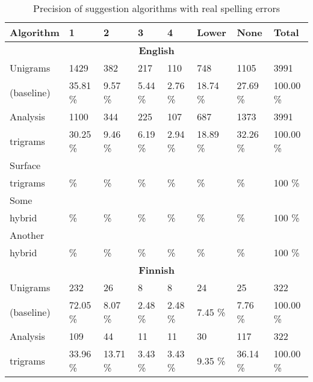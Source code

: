 \documentclass[11pt,a4paper]{article}
\begin{document}
\begin{table*}[h]
  \begin{center}
    \caption{Precision of suggestion algorithms with real spelling errors
    \label{table:real-eval}}
    \begin{scriptsize}
      \begin{tabular}{l|llll|l|l|l}
        \hline
        Algorithm & 1 & 2 & 3 & 4 & Lower & None & Total \\
        \hline
        \multicolumn{8}{c}{\textbf{English}} \\
        \hline
        Unigrams
 & 1429      & 382       & 217       & 110       & 748       & 1105      & 3991     \\
        (baseline) 
 &  35.81 \% &   9.57 \% &   5.44 \% &   2.76 \% &  18.74 \% &  27.69 \% & 100.00 \%\\
        \hline
        Analysis
 & 1100      & 344       & 225       & 107       & 687       & 1373      & 3991     \\
        trigrams
 &  30.25 \% &   9.46 \% &   6.19 \% &   2.94 \% &  18.89 \% &  32.26 \% & 100.00 \%\\
        \hline
        Surface  &       &      &      &      &       &       &     \\
        trigrams &    \% &   \% &   \% &   \% &    \% &    \% & 100 \% \\
        \hline
        Some     &       &      &      &      &       &       &     \\
        hybrid   &    \% &   \% &   \% &   \% &    \% &    \% & 100 \% \\
        \hline
        Another  &       &      &      &      &       &       &     \\
        hybrid   &    \% &   \% &   \% &   \% &    \% &    \% & 100 \% \\
        \hline
        \multicolumn{8}{c}{\textbf{Finnish}} \\
        \hline
        Unigrams  
 & 232       & 26        & 8         & 8         & 24        & 25        & 322      \\
        (baseline) 
 &  72.05 \% &   8.07 \% &   2.48 \% &   2.48 \% &   7.45 \% &   7.76 \% & 100.00 \%\\
        \hline
        Analysis
 & 109       & 44        & 11        & 11        & 30        & 117       & 322      \\
        trigrams
 &  33.96 \% &  13.71 \% &   3.43 \% &   3.43 \% &   9.35 \% &  36.14 \% & 100.00 \%\\

\end{tabular}
\end{scriptsize}
\end{center}
\end{table*}
\end{document}
